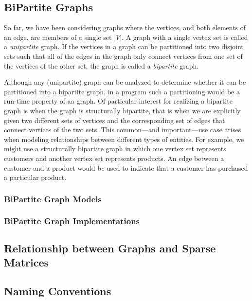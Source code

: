 \subsection{BiPartite Graphs}

So far, we have been considering graphs where the vertices, and both elements of an
edge, are members of a single set $|V|$.  A graph with a single vertex set is called a
\emph{unipartite} graph.  If the vertices in a graph can be partitioned into two
disjoint sets such that all of the edges in the graph only connect vertices from one
set of the vertices of the other set, the graph is called a \emph{bipartite} graph.

Although any (unipartite) graph can be analyzed to determine whether it can be partitioned into a bipartite graph, 
in a program such a partitioning would be a run-time property of aa graph.  Of particular interest for realizing a bipartite graph is when the graph is structurally bipartite, that is when we are explicitly given two different sets of vertices and the corresponding set of edges that connect vertices of the two sets.  This common---and important---use case arises when modeling relationships between different types of entities.  For example, we might use a structurally bipartite graph in which one vertex set represents customers and another vertex set represents products.  An edge between a customer and a product would be used to indicate that a customer has purchased a particular product.



\subsubsection{BiPartite Graph Models}


\subsubsection{BiPartite Graph Implementations}


\subsection{Relationship between Graphs and Sparse Matrices}



\subsection{Naming Conventions}



